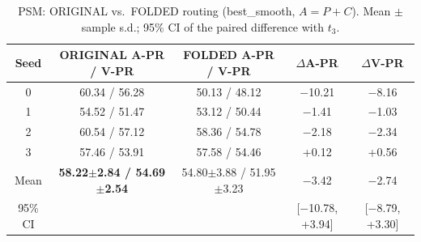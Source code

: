 \documentclass[10pt]{article}
\newcommand{\B}[1]{\textbf{#1}}
\newcommand{\m}{$-$}
\begin{document}
\begin{table}[h]
\centering
\caption{PSM: ORIGINAL vs.\ FOLDED routing (best\_smooth, $A = P + C$). Mean $\pm$ sample s.d.; 95\% CI of the paired difference with $t_{3}$.}
\label{tab:fold}
\begin{tabular}{ccccc}
\toprule
Seed & ORIGINAL A-PR / V-PR & FOLDED A-PR / V-PR & $\Delta$A-PR & $\Delta$V-PR \\
\midrule
0 & 60.34 / 56.28 & 50.13 / 48.12 & \m10.21 & \m8.16 \\
1 & 54.52 / 51.47 & 53.12 / 50.44 & \m1.41 & \m1.03 \\
2 & 60.54 / 57.12 & 58.36 / 54.78 & \m2.18 & \m2.34 \\
3 & 57.46 / 53.91 & 57.58 / 54.46 & +0.12 & +0.56 \\
\midrule
Mean & \B{58.22$\pm$2.84 / 54.69$\pm$2.54} & 54.80$\pm$3.88 / 51.95$\pm$3.23 & \m3.42 & \m2.74 \\
95\% CI & & & [\m10.78, +3.94] & [\m8.79, +3.30] \\
\bottomrule
\end{tabular}
\end{table}
\end{document}
